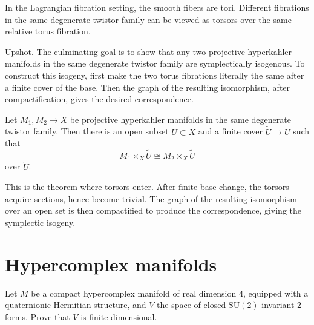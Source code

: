 \noindent
In the Lagrangian fibration setting, the
smooth fibers are tori.
Different fibrations in the same degenerate
twistor family can be viewed as torsors over
the same relative torus fibration.

\medskip
Upshot.
The culminating goal is to show that any two
projective hyperkahler manifolds in the same
degenerate twistor family are symplectically
isogenous.
To construct this isogeny, first make the two
torus fibrations literally the same after a
finite cover of the base.
Then the graph of the resulting isomorphism,
after compactification, gives the desired
correspondence.

\begin{theorem}
\label{theorem-degenerate-twistor-cover}
Let $M_1,M_2\to X$ be projective
hyperkahler manifolds in the same degenerate
twistor family.
Then there is an open subset $U\subset X$
and a finite cover $\widetilde{U}\to U$ such
that
$$
M_1\times_X\widetilde{U}
\cong
M_2\times_X\widetilde{U}
$$
over $\widetilde{U}$.
\end{theorem}

\noindent
This is the theorem where torsors enter.
After finite base change, the torsors acquire
sections, hence become trivial.
The graph of the resulting isomorphism over
an open set is then compactified to produce
the correspondence, giving the symplectic
isogeny.

\section{Hypercomplex manifolds}
\label{section-hypercomplex-manifolds}

\begin{exercise}
\label{exercise-SU2-invariant-forms}
Let $M$ be a compact hypercomplex manifold of
real dimension 4, equipped with a
quaternionic Hermitian structure, and $V$ the
space of closed
$\text{SU}(2)$-invariant 2-forms. Prove that
$V$ is finite-dimensional.
\end{exercise}


